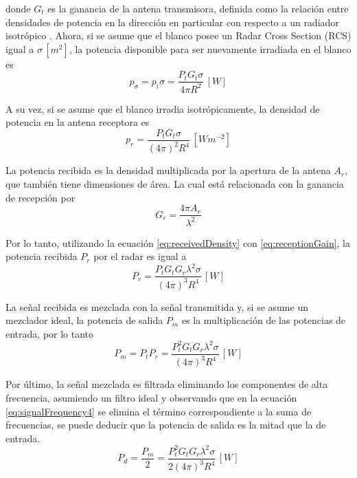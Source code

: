 donde $G_t$ es la ganancia de la antena transmisora, definida como la relación entre densidades de potencia en la dirección en particular con respecto a un radiador isotrópico \cite{Richards2009}. Ahora, si se asume que el blanco posee un Radar Cross Section (RCS) igual a $\sigma \,[\si{m^2}]$, la potencia disponible para ser nuevamente irradiada en el blanco es 
\begin{equation}
  p_\sigma = p_i\sigma = \dfrac{P_tG_t\sigma}{4\pi R^2} \,[\si{W}]
\end{equation}

A su vez, si se asume que el blanco irradia isotrópicamente, la densidad de potencia en la antena receptora es 
\begin{equation} \label{eq:receivedDensity}
  p_r = \dfrac{P_tG_t\sigma}{(4\pi)^2 R^4} \,[\si{Wm^{-2}}]
\end{equation}

La potencia recibida es la densidad multiplicada por la apertura de la antena $A_r$, que también tiene dimensiones de área. La cual está relacionada con la ganancia de recepción por 
\begin{equation} \label{eq:receptionGain}
  G_r = \dfrac{4\pi A_r}{\lambda^2}
\end{equation}

Por lo tanto, utilizando la ecuación \ref{eq:receivedDensity} con \ref{eq:receptionGain}, la potencia recibida $P_r$ por el radar es igual a
\begin{equation}
  P_r = \dfrac{P_tG_tG_r\lambda^2\sigma}{(4\pi)^3 R^4} \,[\si{W}]
\end{equation}

La señal recibida es mezclada con la señal transmitida y, si se asume un mezclador ideal, la potencia de salida $P_m$ es la multiplicación de las potencias de entrada, por lo tanto
\begin{equation}
  P_m = P_tP_r = \dfrac{P_t^2G_tG_r\lambda^2\sigma}{(4\pi)^3 R^4} \,[\si{W}]
\end{equation}

Por último, la señal mezclada es filtrada eliminando los componentes de alta frecuencia, asumiendo un filtro ideal y observando que en la ecuación \ref{eq:signalFrequency4} se elimina el término correspondiente a la suma de frecuencias, se puede deducir que la potencia de salida es la mitad que la de entrada.
\begin{equation} \label{eq:derampedPower}
  P_d = \dfrac{P_m}{2} = \dfrac{P_t^2G_tG_r\lambda^2\sigma}{2(4\pi)^3 R^4} \,[\si{W}]
\end{equation}

